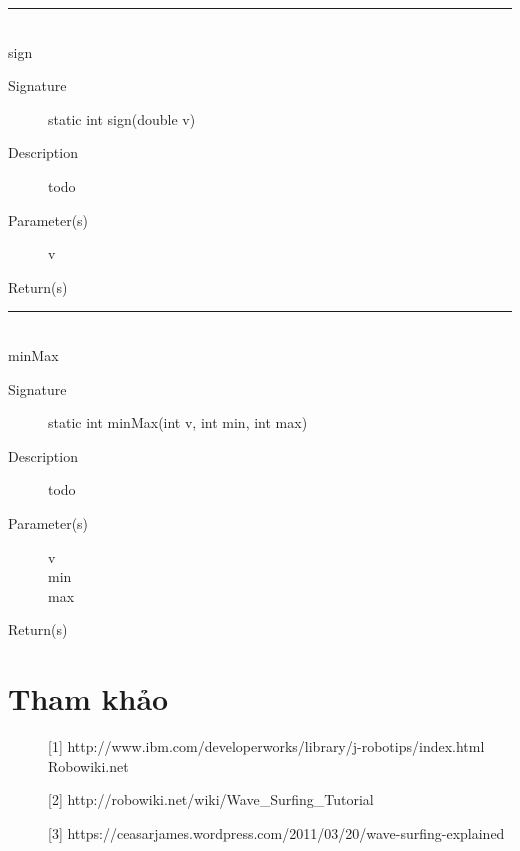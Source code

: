 \documentclass[14pt]{article}
\newcommand{\sep}{\rule{\textwidth}{0.007pt}\\}
\begin{document}
\sep
sign
\begin{description}
	\item[Signature] static int sign(double v)
	\item[Description] todo
	\item[Parameter(s)]
	\begin{description}
		\item[v]
	\end{description}
	\item[Return(s)]
\end{description}
\sep
minMax
\begin{description}
	\item[Signature] static int minMax(int v, int min, int max)
	\item[Description] todo
	\item[Parameter(s)]
	\begin{description}
		\item[v]
		\item[min]
		\item[max]
	\end{description}
	\item[Return(s)]
\end{description}
\section{Tham khảo}
\begin{description}
	\item[][1] http://www.ibm.com/developerworks/library/j-robotips/index.html
Robowiki.net
	\item[][2] http://robowiki.net/wiki/Wave\_Surfing\_Tutorial
	\item[][3] https://ceasarjames.wordpress.com/2011/03/20/wave-surfing-explained
\end{description}
\end{document}
